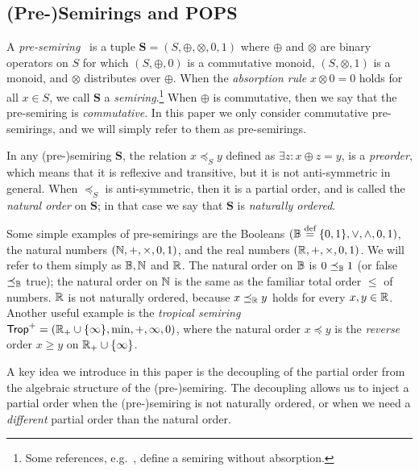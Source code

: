 \subsection{(Pre-)Semirings and POPS}

\begin{defn}
A {\em pre-semiring}~\cite{semiring_book} is a tuple
$\bm S = (S, \oplus, \otimes, 0, 1)$ where $\oplus$ and $\otimes$ are
binary operators on $S$ for which $(S, \oplus, 0)$ is a commutative
monoid, $(S, \otimes, 1)$ is a monoid, and $\otimes$ distributes over
$\oplus$.
When the {\em absorption rule} $x \otimes 0 = 0$ holds
for all $x \in S$, we call $\bm S$ a {\em semiring}.\footnote{Some
  references, e.g.~\cite{DBLP:journals/ai/KohlasW08}, define a
  semiring without absorption.}
%
When $\oplus$ is commutative, then we say that the
pre-semiring is {\em commutative}.  In this paper we only consider
commutative pre-semirings, and we will simply refer to them as
pre-semirings.
\end{defn}

In any (pre-)semiring $\bm S$, the relation $x \preceq_S y$ defined as
$\exists z: x \oplus z = y$, is a {\em preorder}, which means that it
is reflexive and transitive, but it is not anti-symmetric in general.
When $\preceq_S$ is anti-symmetric, then it is a partial order, and is
called the {\em natural order} on $\bm S$; in that case we say that
$\bm S$ is {\em naturally ordered}.

\begin{ex}
  Some simple examples of pre-semirings are the Booleans
  $(\mathbb B \stackrel{\text{def}}{=} \{0,1\}, \vee, \wedge, 0, 1)$, the natural numbers
  $(\mathbb N, +, \times , 0, 1)$, and the real numbers
  $(\mathbb R, +, \times, 0, 1)$.  We will refer to them simply as $\mathbb B, \mathbb N$
  and $\mathbb R$.  The natural order on $\mathbb B$ is $0 \preceq_\mathbb B 1$ (or {\sf
    false} $\preceq_\mathbb B$ {\sf true}); the natural order on $\mathbb N$ is the
  same as the familiar total order $\leq$ of numbers.  $\mathbb R$ is not
  naturally ordered, because $x \preceq_\mathbb R y$ holds for every
  $x,y \in \mathbb R$.  Another useful example is the {\em tropical semiring}
  $\text{\sf Trop}^+ = (\mathbb R_+ \cup \{\infty\}, \min,+, \infty, 0)$, where the
  natural order $x \preceq y$ is the {\em reverse} order $x \geq y$ on
  $\mathbb R_+ \cup \{\infty\}$.
\end{ex}


A key idea we introduce in this paper is the decoupling of the partial order from the
algebraic structure of the (pre-)semiring.
The decoupling allows us to inject a partial order when the (pre-)semiring is not
naturally ordered, or when we need a {\em different} partial order than the natural order.

